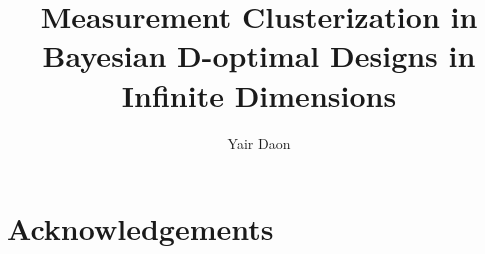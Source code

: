 \documentclass{amsart}
\title[Measurement Clusterization in D-optimal Designs]{Measurement Clusterization in Bayesian D-optimal Designs in Infinite Dimensions}
\author{Yair Daon}
\begin{document}
\maketitle

\begin{abstract}
  
\end{abstract}









\section{Acknowledgements}





\end{document}
